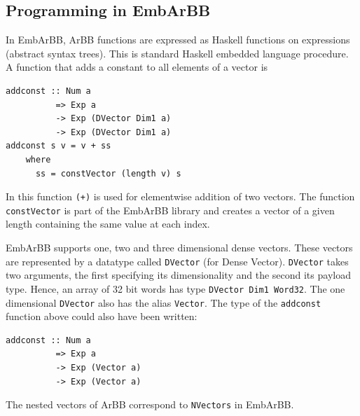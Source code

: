 

\subsection{Programming in EmbArBB} 
\label{sec:Programming}



In EmbArBB, ArBB functions are expressed as Haskell functions on expressions
(abstract syntax trees). This is standard Haskell embedded language procedure. 
A function that adds a constant to all elements of a vector is

\begin{verbatim}
addconst :: Num a 
          => Exp a 
          -> Exp (DVector Dim1 a) 
          -> Exp (DVector Dim1 a) 
addconst s v = v + ss 
    where 
      ss = constVector (length v) s 
\end{verbatim}

In this function {\tt (+)} is used for elementwise addition of two vectors. 
The function {\tt constVector} is part of the EmbArBB library and creates a vector 
of a given length containing the same value at each index. 

EmbArBB supports one, two and three dimensional dense vectors. These vectors are 
represented by a datatype called {\tt DVector} (for Dense Vector). {\tt DVector} takes two 
arguments, the first specifying its dimensionality and the second its payload 
type. Hence, an array of 32 bit words has type {\tt DVector Dim1 Word32}.
The one dimensional {\tt DVector} also has the alias {\tt Vector}. The type 
of the {\tt addconst} function above could also have been written: 

\begin{verbatim}
addconst :: Num a 
          => Exp a 
          -> Exp (Vector a) 
          -> Exp (Vector a) 
\end{verbatim}

The nested vectors of ArBB correspond to {\tt NVectors} in EmbArBB. 

